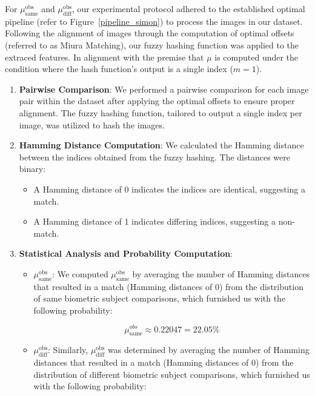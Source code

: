For \(\mu_{\text{same}}^{\text{obs}}\) and \(\mu_{\text{diff}}^{\text{obs}}\), our experimental protocol adhered to the established optimal pipeline (refer to Figure~\ref{pipeline_simon}) to process the images in our dataset. Following the alignment of images through the computation of optimal offsets (referred to as Miura Matching), our fuzzy hashing function was applied to the extraced features. In alignment with the premise that \(\mu\) is computed under the condition where the hash function's output is a single index (\(m=1\)).

\begin{enumerate}
    \item \textbf{Pairwise Comparison}: We performed a pairwise comparison for each image pair within the dataset after applying the optimal offsets to ensure proper alignment. The fuzzy hashing function, tailored to output a single index per image, was utilized to hash the images.

    \item \textbf{Hamming Distance Computation}: We calculated the Hamming distance between the indices obtained from the fuzzy hashing. The distances were binary:
    \begin{itemize}
        \item A Hamming distance of 0 indicates the indices are identical, suggesting a match.
        \item A Hamming distance of 1 indicates differing indices, suggesting a non-match.
    \end{itemize} 
    
    \item \textbf{Statistical Analysis and Probability Computation}:
    \begin{itemize}
        \item \textbf{\(\mu_{\text{same}}^{\text{obs}}\)}: We computed \(\mu_{\text{same}}^{\text{obs}}\) by averaging the number of Hamming distances that resulted in a match (Hamming distances of 0) from the distribution of same biometric subject comparisons, which furnished us with the following probability:

        \[ \mu_{\text{same}}^{obs} \approx 0.22047 = 22.05\%\]
        
        \item \textbf{\(\mu_{\text{diff}}^{\text{obs}}\)}: Similarly, \(\mu_{\text{diff}}^{\text{obs}}\) was determined by averaging the number of Hamming distances that resulted in a match (Hamming distances of 0) from the distribution of different biometric subject comparisons, which furnished us with the following probability:


\end{itemize}
\end{enumerate}
